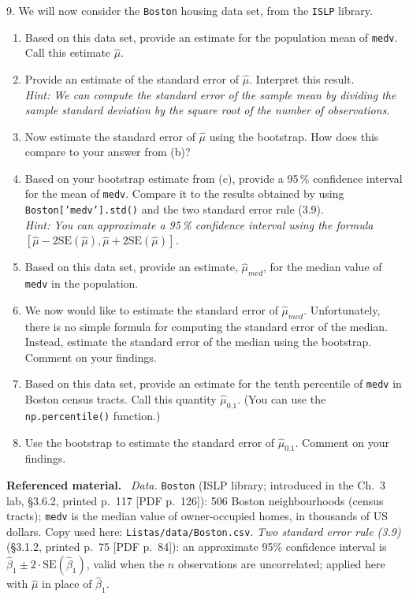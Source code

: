 \documentclass[11pt,a4paper]{article}
\numberwithin{equation}{questao}   %
\newenvironment{refmat}{\par\smallskip\noindent\small\textbf{Referenced material.}\ }{\par\smallskip}
\begin{document}
9. We will now consider the \texttt{Boston} housing data set, from the \texttt{ISLP} library.
\begin{enumerate}[label=(\alph*),leftmargin=2.4em]
\item Based on this data set, provide an estimate for the population mean of \texttt{medv}. Call
this estimate $\hat\mu$.
\item Provide an estimate of the standard error of $\hat\mu$. Interpret this result.\\
\textit{Hint: We can compute the standard error of the sample mean by dividing the sample standard
deviation by the square root of the number of observations.}
\item Now estimate the standard error of $\hat\mu$ using the bootstrap. How does this compare to
your answer from (b)?
\item Based on your bootstrap estimate from (c), provide a 95\,\% confidence interval for the mean
of \texttt{medv}. Compare it to the results obtained by using \texttt{Boston['medv'].std()} and the
two standard error rule (3.9).\\
\textit{Hint: You can approximate a 95\,\% confidence interval using the formula
$[\hat\mu-2\mathrm{SE}(\hat\mu),\hat\mu+2\mathrm{SE}(\hat\mu)]$.}
\item Based on this data set, provide an estimate, $\hat\mu_{med}$, for the median value of
\texttt{medv} in the population.
\item We now would like to estimate the standard error of $\hat\mu_{med}$. Unfortunately, there is
no simple formula for computing the standard error of the median. Instead, estimate the standard
error of the median using the bootstrap. Comment on your findings.
\item Based on this data set, provide an estimate for the tenth percentile of \texttt{medv} in
Boston census tracts. Call this quantity $\hat\mu_{0.1}$. (You can use the \texttt{np.percentile()}
function.)
\item Use the bootstrap to estimate the standard error of $\hat\mu_{0.1}$. Comment on your findings.
\end{enumerate}
\begin{refmat}
\emph{Data.} \texttt{Boston} (ISLP library; introduced in the Ch.~3 lab, §3.6.2, printed p.~117
[PDF p.~126]): 506 Boston neighbourhoods (census tracts); \texttt{medv} is the median value of
owner-occupied homes, in thousands of US dollars. Copy used here: \texttt{Listas/data/Boston.csv}.
\emph{Two standard error rule (3.9)} (§3.1.2, printed p.~75 [PDF p.~84]): an approximate 95\%
confidence interval is $\hat\beta_1\pm2\cdot\mathrm{SE}(\hat\beta_1)$, valid when the $n$ observations
are uncorrelated; applied here with $\hat\mu$ in place of $\hat\beta_1$.
\end{refmat}
\end{document}
